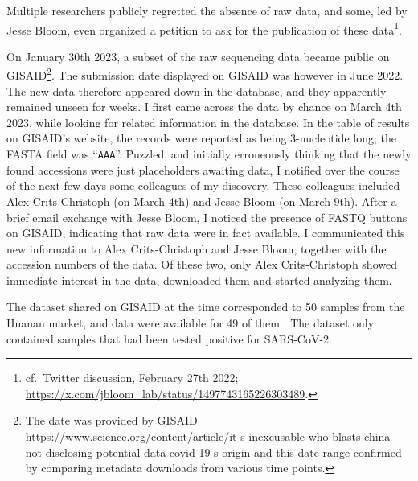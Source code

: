 \documentclass[11pt]{article}
\def \sct {\mbox{SARS-CoV-2}}
\begin{document}
Multiple researchers publicly regretted the absence of raw data, and some, led by Jesse Bloom, even organized a petition to ask for the publication of these data\footnote{cf.\ Twitter discussion, February 27th 2022; \url{https://x.com/jbloom_lab/status/1497743165226303489}.}.

On January 30th 2023, a subset of the raw sequencing data became public on GISAID\footnote{The date was provided by GISAID \url{https://www.science.org/content/article/it-s-inexcusable-who-blasts-china-not-disclosing-potential-data-covid-19-s-origin} and this date range confirmed by comparing metadata downloads from various time points.}. The submission date displayed on GISAID was however in June 2022. The new data therefore appeared down in the database, and they apparently remained unseen for weeks. I first came across the data by chance on March 4th 2023, while looking for related information in the database. In the table of results on GISAID's website, the records were reported as being 3-nucleotide long; the FASTA field was “\texttt{AAA}”. Puzzled, and initially erroneously thinking that the newly found accessions were just placeholders awaiting data, I notified over the course of the next few days some colleagues of my discovery. These colleagues included Alex Crits-Christoph (on March 4th) and Jesse Bloom (on March 9th). After a brief email exchange with Jesse Bloom, I noticed the presence of FASTQ buttons on GISAID, indicating that raw data were in fact available. I communicated this new information to Alex Crits-Christoph and Jesse Bloom, together with the accession numbers of the data. Of these two, only Alex Crits-Christoph showed immediate interest in the data, downloaded them and started analyzing them. 

The dataset shared on GISAID at the time corresponded to 50 samples from the Huanan market, and data were available for 49 of them \citep{ACC2023Zenodo}. The dataset only contained samples that had been tested positive for \sct{}. 
\end{document}
